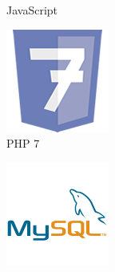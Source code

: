\begin{figure}[H]
\begin{subfigure}[t]{0.2\linewidth}
        \caption{JavaScript}\label{fig:JavaScript}
    \end{subfigure}
    \quad
    \begin{subfigure}[t]{0.2\linewidth}
        \centering
        \includegraphics[width=\linewidth]{Images/Generic/Icons/PHP_7}
        \caption{PHP 7}\label{fig:PHP_7}
    \end{subfigure}
    \quad
    \begin{subfigure}[t]{0.2\linewidth}
        \centering
        \includegraphics[width=\linewidth]{Images/Generic/Icons/MySQL}

\end{subfigure}
\end{figure}

